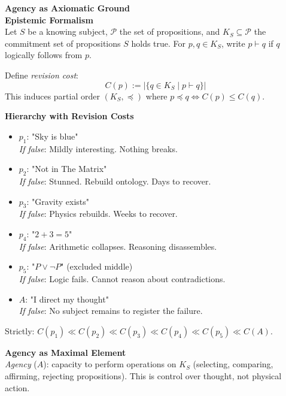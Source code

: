 \begin{technical}
    {\Large\textbf{Agency as Axiomatic Ground}}\\[0.5em]

    \textbf{Epistemic Formalism}\\[0.3em]
    Let $S$ be a knowing subject, $\mathcal{P}$ the set of propositions, and $K_S \subseteq \mathcal{P}$ the commitment set of propositions $S$ holds true. For $p, q \in K_S$, write $p \vdash q$ if $q$ logically follows from $p$.
    
    Define \textit{revision cost}:
    \[
    C(p) := |\{q \in K_S \mid p \vdash q\}|
    \]
    This induces partial order $(K_S, \preceq)$ where $p \preceq q \iff C(p) \leq C(q)$.

    \textbf{Hierarchy with Revision Costs}\\[0.3em]
    \begin{itemize}[leftmargin=*,topsep=0pt,itemsep=1pt]
        \item $p_1$: "Sky is blue"\\
        \textit{If false}: Mildly interesting. Nothing breaks.
        \item $p_2$: "Not in The Matrix"\\
        \textit{If false}: Stunned. Rebuild ontology. Days to recover.
        \item $p_3$: "Gravity exists"\\
        \textit{If false}: Physics rebuilds. Weeks to recover.
        \item $p_4$: "$2+3=5$"\\
        \textit{If false}: Arithmetic collapses. Reasoning disassembles.
        \item $p_5$: "$P \vee \neg P$" (excluded middle)\\
        \textit{If false}: Logic fails. Cannot reason about contradictions.
        \item $A$: "I direct my thought"\\
        \textit{If false}: No subject remains to register the failure.
    \end{itemize}
    Strictly: $C(p_1) \ll C(p_2) \ll C(p_3) \ll C(p_4) \ll C(p_5) \ll C(A)$.

    \textbf{Agency as Maximal Element}\\[0.3em]
    \textit{Agency} ($A$): capacity to perform operations on $K_S$ (selecting, comparing, affirming, rejecting propositions). This is control over thought, not physical action.
    

\end{technical}
